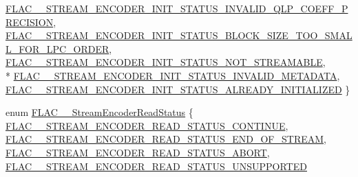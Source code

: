 \begin{DoxyCompactItemize}
\hyperlink{group__flac__stream__encoder_gga3bb869620af2b188d77982a5c30b047da5be80403bd7a43450139442e0f34ad7e}{F\+L\+A\+C\+\_\+\+\_\+\+S\+T\+R\+E\+A\+M\+\_\+\+E\+N\+C\+O\+D\+E\+R\+\_\+\+I\+N\+I\+T\+\_\+\+S\+T\+A\+T\+U\+S\+\_\+\+I\+N\+V\+A\+L\+I\+D\+\_\+\+Q\+L\+P\+\_\+\+C\+O\+E\+F\+F\+\_\+\+P\+R\+E\+C\+I\+S\+I\+ON}, 
\hyperlink{group__flac__stream__encoder_gga3bb869620af2b188d77982a5c30b047da62a17a3ed3c05ddf8ea7f6fecbd4e4a1}{F\+L\+A\+C\+\_\+\+\_\+\+S\+T\+R\+E\+A\+M\+\_\+\+E\+N\+C\+O\+D\+E\+R\+\_\+\+I\+N\+I\+T\+\_\+\+S\+T\+A\+T\+U\+S\+\_\+\+B\+L\+O\+C\+K\+\_\+\+S\+I\+Z\+E\+\_\+\+T\+O\+O\+\_\+\+S\+M\+A\+L\+L\+\_\+\+F\+O\+R\+\_\+\+L\+P\+C\+\_\+\+O\+R\+D\+ER}, 
\hyperlink{group__flac__stream__encoder_gga3bb869620af2b188d77982a5c30b047daa793405c858c7606539082750080a47e}{F\+L\+A\+C\+\_\+\+\_\+\+S\+T\+R\+E\+A\+M\+\_\+\+E\+N\+C\+O\+D\+E\+R\+\_\+\+I\+N\+I\+T\+\_\+\+S\+T\+A\+T\+U\+S\+\_\+\+N\+O\+T\+\_\+\+S\+T\+R\+E\+A\+M\+A\+B\+LE}, 
\\*
\hyperlink{group__flac__stream__encoder_gga3bb869620af2b188d77982a5c30b047daa85afdd1849c75a19594416cef63e3e9}{F\+L\+A\+C\+\_\+\+\_\+\+S\+T\+R\+E\+A\+M\+\_\+\+E\+N\+C\+O\+D\+E\+R\+\_\+\+I\+N\+I\+T\+\_\+\+S\+T\+A\+T\+U\+S\+\_\+\+I\+N\+V\+A\+L\+I\+D\+\_\+\+M\+E\+T\+A\+D\+A\+TA}, 
\hyperlink{group__flac__stream__encoder_gga3bb869620af2b188d77982a5c30b047dab4e7b50d176a127575df90383cb15e1d}{F\+L\+A\+C\+\_\+\+\_\+\+S\+T\+R\+E\+A\+M\+\_\+\+E\+N\+C\+O\+D\+E\+R\+\_\+\+I\+N\+I\+T\+\_\+\+S\+T\+A\+T\+U\+S\+\_\+\+A\+L\+R\+E\+A\+D\+Y\+\_\+\+I\+N\+I\+T\+I\+A\+L\+I\+Z\+ED}
 \}
\item 
enum \hyperlink{group__flac__stream__encoder_ga2e81f007fb0a7414c0bbb453f37ea37f}{F\+L\+A\+C\+\_\+\+\_\+\+Stream\+Encoder\+Read\+Status} \{ \hyperlink{group__flac__stream__encoder_gga2e81f007fb0a7414c0bbb453f37ea37fa4bdd691d3666f19ec96ff99402347a2e}{F\+L\+A\+C\+\_\+\+\_\+\+S\+T\+R\+E\+A\+M\+\_\+\+E\+N\+C\+O\+D\+E\+R\+\_\+\+R\+E\+A\+D\+\_\+\+S\+T\+A\+T\+U\+S\+\_\+\+C\+O\+N\+T\+I\+N\+UE}, 
\hyperlink{group__flac__stream__encoder_gga2e81f007fb0a7414c0bbb453f37ea37fa562fef84bf86a9a39682e23066d9cfee}{F\+L\+A\+C\+\_\+\+\_\+\+S\+T\+R\+E\+A\+M\+\_\+\+E\+N\+C\+O\+D\+E\+R\+\_\+\+R\+E\+A\+D\+\_\+\+S\+T\+A\+T\+U\+S\+\_\+\+E\+N\+D\+\_\+\+O\+F\+\_\+\+S\+T\+R\+E\+AM}, 
\hyperlink{group__flac__stream__encoder_gga2e81f007fb0a7414c0bbb453f37ea37fa69b94eeab60e07d5fd33f2b3c8b85759}{F\+L\+A\+C\+\_\+\+\_\+\+S\+T\+R\+E\+A\+M\+\_\+\+E\+N\+C\+O\+D\+E\+R\+\_\+\+R\+E\+A\+D\+\_\+\+S\+T\+A\+T\+U\+S\+\_\+\+A\+B\+O\+RT}, 
\hyperlink{group__flac__stream__encoder_gga2e81f007fb0a7414c0bbb453f37ea37fa9bb730b8f6354cc1e810017a2f700316}{F\+L\+A\+C\+\_\+\+\_\+\+S\+T\+R\+E\+A\+M\+\_\+\+E\+N\+C\+O\+D\+E\+R\+\_\+\+R\+E\+A\+D\+\_\+\+S\+T\+A\+T\+U\+S\+\_\+\+U\+N\+S\+U\+P\+P\+O\+R\+T\+ED}

\end{DoxyCompactItemize}
